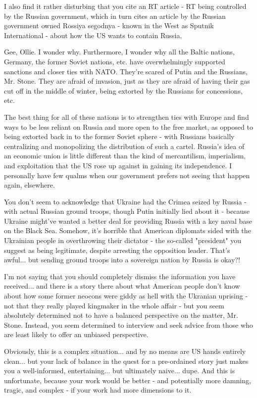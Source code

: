 \begin{itemize}
I also find it rather disturbing that you cite an RT article - RT being
controlled by the Russian government, which in turn cites an article by the
Russian government owned Rossiya segodnya - known in the West as Sputnik
International - about how the US wants to contain Russia.

Gee, Ollie. I wonder why. Furthermore, I wonder why all the Baltic nations,
Germany, the former Soviet nations, etc. have overwhelmingly supported
sanctions and closer ties with NATO. They're scared of Putin and the Russians,
Mr. Stone. They are afraid of invasion, just as they are afraid of having their
gas cut off in the middle of winter, being extorted by the Russians for
concessions, etc.

The best thing for all of these nations is to strengthen ties with Europe and
find ways to be less reliant on Russia and more open to the free market, as
opposed to being extorted back in to the former Soviet sphere - with Russians
basically centralizing and monopolizing the distribution of such a cartel.
Russia's idea of an economic union is little different than the kind of
mercantilism, imperialism, and exploitation that the US rose up against in
gaining its independence. I personally have few qualms when our government
prefers not seeing that happen again, elsewhere.

You don't seem to acknowledge that Ukraine had the Crimea seized by Russia -
with actual Russian ground troops, though Putin initially lied about it -
because Ukraine might've wanted a better deal for providing Russia with a key
naval base on the Black Sea. Somehow, it's horrible that American diplomats
sided with the Ukrainian people in overthrowing their dictator - the so-called
"president" you suggest as being legitimate, despite arresting the opposition
leader. That's awful... but sending ground troops into a sovereign nation by
Russia is okay?!

I'm not saying that you should completely dismiss the information you have
received... and there is a story there about what American people don't know
about how some former neocons were giddy as hell with the Ukranian uprising -
not that they really played kingmaker in the whole affair - but you seem
absolutely determined not to have a balanced perspective on the matter, Mr.
Stone. Instead, you seem determined to interview and seek advice from those who
are least likely to offer an unbiased perspective.

Obviously, this is a complex situation... and by no means are US hands entirely
clean... but your lack of balance in the quest for a pre-ordained story just
makes you a well-informed, entertaining... but ultimately naive... dupe. And
this is unfortunate, because your work would be better - and potentially more
damning, tragic, and complex - if your work had more dimensions to it.


\end{itemize}

